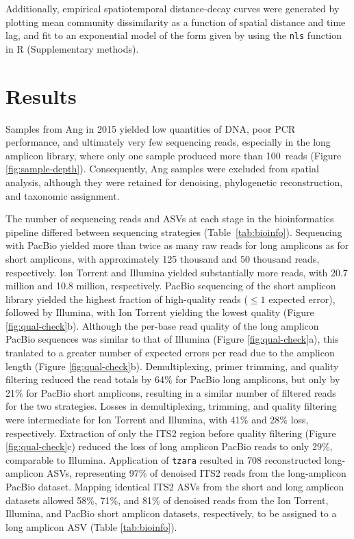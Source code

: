 \documentclass[
  12pt,
]{article}
\begin{document}
Additionally, empirical spatiotemporal distance-decay curves were generated by plotting mean community dissimilarity as a function of spatial distance and time lag, and fit to an exponential model of the form given by \textcite{legendre2012} using the \texttt{nls} function in R (Supplementary methods).

\hypertarget{results}{%
\section{Results}\label{results}}

Samples from Ang in 2015 yielded low quantities of DNA, poor PCR performance, and ultimately very few sequencing reads, especially in the long amplicon library, where only one sample produced more than 100~reads (Figure \ref{fig:sample-depth}).
Consequently, Ang samples were excluded from spatial analysis, although they were retained for denoising, phylogenetic reconstruction, and taxonomic assignment.

The number of sequencing reads and ASVs at each stage in the bioinformatics pipeline differed between sequencing strategies (Table~\ref{tab:bioinfo}).
Sequencing with PacBio yielded more than twice as many raw reads for long amplicons as for short amplicons, with approximately 125 thousand and 50 thousand reads, respectively.
Ion Torrent and Illumina yielded substantially more reads, with 20.7 million and 10.8 million, respectively.
PacBio sequencing of the short amplicon library yielded the highest fraction of high-quality reads (\(\le 1\) expected error), followed by Illumina, with Ion Torrent yielding the lowest quality (Figure \ref{fig:qual-check}b).
Although the per-base read quality of the long amplicon PacBio sequences was similar to that of Illumina (Figure \ref{fig:qual-check}a), this tranlated to a greater number of expected errors per read due to the amplicon length (Figure \ref{fig:qual-check}b).
Demultiplexing, primer trimming, and quality filtering reduced the read totals by 64\% for PacBio long amplicons, but only by 21\% for PacBio short amplicons, resulting in a similar number of filtered reads for the two strategies.
Losses in demultiplexing, trimming, and quality filtering were intermediate for Ion Torrent and Illumina, with 41\% and 28\% loss, respectively.
Extraction of only the ITS2 region before quality filtering (Figure \ref{fig:qual-check}c) reduced the loss of long amplicon PacBio reads to only 29\%, comparable to Illumina.
Application of \texttt{tzara} resulted in 708 reconstructed long-amplicon ASVs, representing 97\% of denoised ITS2 reads from the long-amplicon PacBio dataset.
Mapping identical ITS2 ASVs from the short and long amplicon datasets allowed 58\%, 71\%, and 81\% of denoised reads from the Ion Torrent, Illumina, and PacBio short amplicon datasets, respectively, to be assigned to a long amplicon ASV (Table \ref{tab:bioinfo}).
\end{document}
